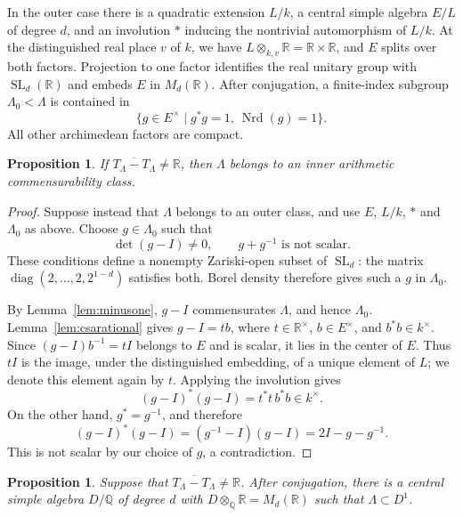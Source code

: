 \documentclass[reqno]{amsart}
\newtheorem{proposition}[theorem]{Proposition}
\theoremstyle{remark}
\DeclareMathOperator{\Nrd}{Nrd}
\DeclareMathOperator{\SL}{SL}
\newcommand{\R}{\mathbb R}
\newcommand{\Q}{\mathbb Q}
\begin{document}
In the outer case there is a quadratic extension $L/k$, a central simple algebra $E/L$ of degree $d$, and an involution $*$ inducing the nontrivial automorphism of $L/k$. At the distinguished real place $v$ of $k$, we have $L\otimes_{k,v}\R=\R\times\R$, and $E$ splits over both factors. Projection to one factor identifies the real unitary group with $\SL_d(\R)$ and embeds $E$ in $M_d(\R)$. After conjugation, a finite-index subgroup $\Lambda_0<\Lambda$ is contained in
$$
\{g\in E^\times \mid g^*g=1,\ \Nrd(g)=1\}.
$$
All other archimedean factors are compact.

\begin{proposition}\label{prop:inner}
If $\overline{T_\Lambda-T_\Lambda}\ne\R$, then $\Lambda$ belongs to an inner arithmetic commensurability class.
\end{proposition}

\begin{proof}
Suppose instead that $\Lambda$ belongs to an outer class, and use $E$, $L/k$, $*$ and $\Lambda_0$ as above. Choose $g\in\Lambda_0$ such that
$$
\det(g-I)\ne0,\qquad g+g^{-1}\text{ is not scalar}.
$$
These conditions define a nonempty Zariski-open subset of $\SL_d$: the matrix $\operatorname{diag}(2,\ldots,2,2^{1-d})$ satisfies both. Borel density therefore gives such a $g$ in $\Lambda_0$.

By Lemma~\ref{lem:minusone}, $g-I$ commensurates $\Lambda$, and hence $\Lambda_0$. Lemma~\ref{lem:csarational} gives $g-I=tb$, where $t\in\R^\times$, $b\in E^\times$, and $b^*b\in k^\times$. Since $(g-I)b^{-1}=tI$ belongs to $E$ and is scalar, it lies in the center of $E$. Thus $tI$ is the image, under the distinguished embedding, of a unique element of $L$; we denote this element again by $t$. Applying the involution gives
$$
(g-I)^*(g-I)=t^*t\,b^*b\in k^\times.
$$
On the other hand, $g^*=g^{-1}$, and therefore
$$
(g-I)^*(g-I)=(g^{-1}-I)(g-I)=2I-g-g^{-1}.
$$
This is not scalar by our choice of $g$, a contradiction.
\end{proof}

\begin{proposition}\label{prop:sldcontainment}
Suppose that $\overline{T_\Lambda-T_\Lambda}\ne\R$. After conjugation, there is a central simple algebra $D/\Q$ of degree $d$ with $D\otimes_\Q\R=M_d(\R)$ such that $\Lambda\subset D^1$.
\end{proposition}
\end{document}
